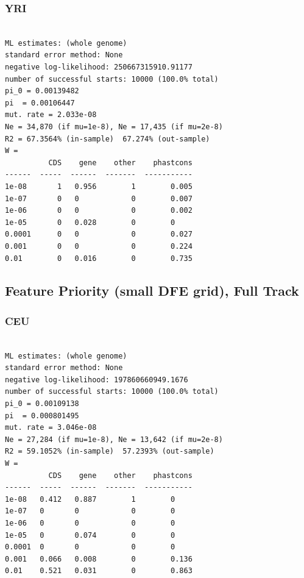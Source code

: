 \documentclass[11pt]{article}
\begin{document}
\subsubsection*{YRI}
\begin{minipage}{\linewidth}\begin{footnotesize}
\begin{verbatim}

ML estimates: (whole genome)
standard error method: None
negative log-likelihood: 250667315910.91177
number of successful starts: 10000 (100.0% total)
pi_0 = 0.00139482
pi  = 0.00106447
mut. rate = 2.033e-08 
Ne = 34,870 (if mu=1e-8), Ne = 17,435 (if mu=2e-8)
R2 = 67.3564% (in-sample)  67.274% (out-sample)
W = 
          CDS    gene    other    phastcons
------  -----  ------  -------  -----------
1e-08       1   0.956        1        0.005
1e-07       0   0            0        0.007
1e-06       0   0            0        0.002
1e-05       0   0.028        0        0
0.0001      0   0            0        0.027
0.001       0   0            0        0.224
0.01        0   0.016        0        0.735
\end{verbatim}
\end{footnotesize}\end{minipage}


\subsection{Feature Priority (small DFE grid), Full Track}
\subsubsection*{CEU}
\begin{minipage}{\linewidth}\begin{footnotesize}
\begin{verbatim}

ML estimates: (whole genome)
standard error method: None
negative log-likelihood: 197860660949.1676
number of successful starts: 10000 (100.0% total)
pi_0 = 0.00109138
pi  = 0.000801495
mut. rate = 3.046e-08 
Ne = 27,284 (if mu=1e-8), Ne = 13,642 (if mu=2e-8)
R2 = 59.1052% (in-sample)  57.2393% (out-sample)
W = 
          CDS    gene    other    phastcons
------  -----  ------  -------  -----------
1e-08   0.412   0.887        1        0
1e-07   0       0            0        0
1e-06   0       0            0        0
1e-05   0       0.074        0        0
0.0001  0       0            0        0
0.001   0.066   0.008        0        0.136
0.01    0.521   0.031        0        0.863
\end{verbatim}
\end{footnotesize}\end{minipage}
\end{document}
